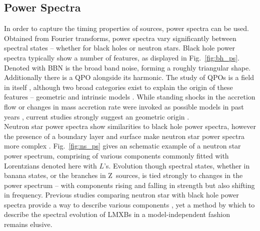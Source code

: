 \subsection{Power Spectra}
In order to capture the timing properties of sources, power spectra can be used. Obtained from Fourier transforms, power spectra vary significantly between spectral states -- whether for black holes or neutron stars. Black hole power spectra typically show a number of features, as displayed in Fig.~\ref{fig:bh_ps}. Denoted with \acs{BBN} is the broad band noise, forming a roughly triangular shape. Additionally there is a \acf{QPO} alongside its harmonic. The study of \acp{QPO} is a field in itself \citep[see][for an overview]{van2006rapid}, although two broad categories exist to explain the origin of these features -- geometric and intrinsic models \citep{van2016probing}. While standing shocks in the accretion flow or changes in mass accretion rate were invoked as possible models in past years \citep[e.g.][]{chakrabarti1993smoothed,tagger1999accretion}, current studies strongly suggest an geometric origin \citep[see][van den Eijnden, 2016, in prep]{heil2015inclination,motta2015geometrical}.\\

Neutron star power spectra show similarities to black hole power spectra, however the presence of a boundary layer and surface make neutron star power spectra more complex \citep{kleinwolt}. Fig.~\ref{fig:ns_ps} gives an schematic example of a neutron star power spectrum, comprising of various components commonly fitted with Lorentzians denoted here with $L$'s. Evolution though spectral states, whether in banana states, or the branches in Z~sources, is tied strongly to changes in the power spectrum -- with components rising and falling in strength but also shifting in frequency. Previous studies comparing neutron star with black hole power spectra provide a way to describe various components \citep[e.g.][]{van1994similarities,wijnands1999broadband,sunyaev2000fourier}, yet a method by which to describe the spectral evolution of \acp{LMXB} in a model-independent fashion remains elusive.\\


